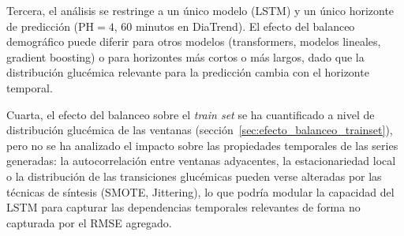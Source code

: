 Tercera, el análisis se restringe a un único modelo (LSTM) y un único
horizonte de predicción (PH$=4$, 60 minutos en DiaTrend). El efecto
del balanceo demográfico puede diferir para otros modelos (transformers,
modelos lineales, gradient boosting) o para horizontes más cortos o más
largos, dado que la distribución glucémica relevante para la predicción
cambia con el horizonte temporal.

Cuarta, el efecto del balanceo sobre el \textit{train set} se ha
cuantificado a nivel de distribución glucémica de las ventanas
(sección~\ref{sec:efecto_balanceo_trainset}), pero no se ha analizado
el impacto sobre las propiedades temporales de las series generadas:
la autocorrelación entre ventanas adyacentes, la estacionariedad local
o la distribución de las transiciones glucémicas pueden verse alteradas
por las técnicas de síntesis (SMOTE, Jittering), lo que podría modular
la capacidad del LSTM para capturar las dependencias temporales relevantes
de forma no capturada por el RMSE agregado.